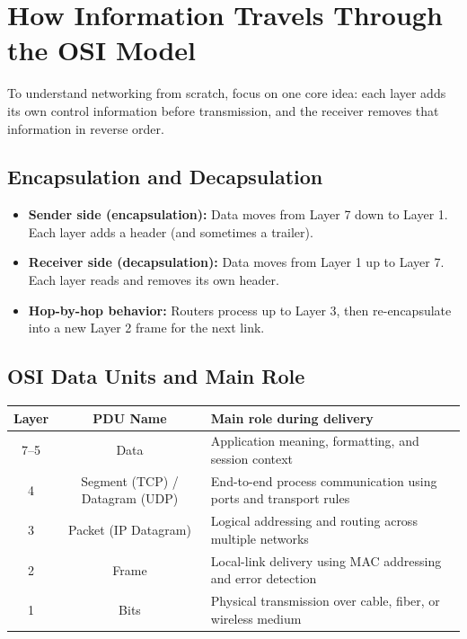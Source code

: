\documentclass[12pt,a4paper]{article}
\begin{document}
\section*{How Information Travels Through the OSI Model}
To understand networking from scratch, focus on one core idea: each layer adds its own control information before transmission, and the receiver removes that information in reverse order.

\subsection*{Encapsulation and Decapsulation}
\begin{itemize}
    \item \textbf{Sender side (encapsulation):} Data moves from Layer 7 down to Layer 1. Each layer adds a header (and sometimes a trailer).
    \item \textbf{Receiver side (decapsulation):} Data moves from Layer 1 up to Layer 7. Each layer reads and removes its own header.
    \item \textbf{Hop-by-hop behavior:} Routers process up to Layer 3, then re-encapsulate into a new Layer 2 frame for the next link.
\end{itemize}

\subsection*{OSI Data Units and Main Role}
\begin{center}
\begin{tabular}{|c|c|p{7.5cm}|}
    \hline
    \textbf{Layer} & \textbf{PDU Name} & \textbf{Main role during delivery} \\
    \hline
    7--5 & Data & Application meaning, formatting, and session context \\
    \hline
    4 & Segment (TCP) / Datagram (UDP) & End-to-end process communication using ports and transport rules \\
    \hline
    3 & Packet (IP Datagram) & Logical addressing and routing across multiple networks \\
    \hline
    2 & Frame & Local-link delivery using MAC addressing and error detection \\
    \hline
    1 & Bits & Physical transmission over cable, fiber, or wireless medium \\
    \hline
\end{tabular}
\end{center}
\end{document}
